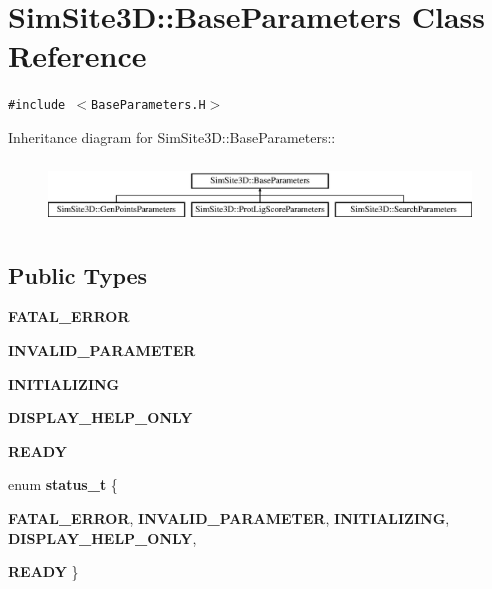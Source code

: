 \section{SimSite3D::Base\-Parameters Class Reference}
\label{classSimSite3D_1_1BaseParameters}
{\tt \#include $<$Base\-Parameters.H$>$}

Inheritance diagram for SimSite3D::Base\-Parameters::\begin{figure}[H]
\begin{center}
\leavevmode
\includegraphics[height=1.72043cm]{classSimSite3D_1_1BaseParameters}
\end{center}
\end{figure}
\subsection*{Public Types}
\begin{CompactItemize}
\item 
\textbf{FATAL\_\-ERROR}\label{classSimSite3D_1_1BaseParameters_c80c7d6d1460ac21aee9af9e4adb27962ecf94b471dd1d92cfef939f1d8e5c5b}

\item 
\textbf{INVALID\_\-PARAMETER}\label{classSimSite3D_1_1BaseParameters_c80c7d6d1460ac21aee9af9e4adb27966a7dcbce394da1874589a864461ca96c}

\item 
\textbf{INITIALIZING}\label{classSimSite3D_1_1BaseParameters_c80c7d6d1460ac21aee9af9e4adb2796e0f14c6cff9f988fb50cd648984af4c8}

\item 
\textbf{DISPLAY\_\-HELP\_\-ONLY}\label{classSimSite3D_1_1BaseParameters_c80c7d6d1460ac21aee9af9e4adb2796009c052e63810d9249f5ba6d26733fcb}

\item 
\textbf{READY}\label{classSimSite3D_1_1BaseParameters_c80c7d6d1460ac21aee9af9e4adb27965688a5856aa9d26946abec13ed716dac}

\item 
enum \textbf{status\_\-t} \{ \par
\textbf{FATAL\_\-ERROR}, 
\textbf{INVALID\_\-PARAMETER}, 
\textbf{INITIALIZING}, 
\textbf{DISPLAY\_\-HELP\_\-ONLY}, 
\par
\textbf{READY}
 \}
\end{CompactItemize}
